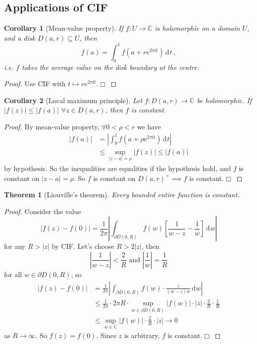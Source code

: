 \documentclass{article}
\theoremstyle{plain}\theoremheaderfont{\normalfont\itshape}\theorembodyfont{\rmfamily}\theoremseparator{.}\newtheorem*{rem}{Remark}\newtheorem*{ex}{Example}\newtheorem*{proof}{Proof}\newtheorem*{altp}{Alternative proof}\newtheorem*{con}{Consequences}\newtheorem*{notn}{Notations}\newtheorem*{cau}{Caution}\newtheorem*{term}{Terminology}\newtheorem*{keyex}{Key example}
\theoremstyle{plain}\theoremheaderfont{\normalfont\bfseries}\theorembodyfont{\rmfamily}\theoremseparator{.}\newtheorem{thm}{Theorem}[section]\newtheorem{lem}[thm]{Lemma}\newtheorem{prop}[thm]{Proposition}\newtheorem*{cor}{Corollary}\newtheorem{defn}[thm]{Definition}\newtheorem{clm}[thm]{Claim}\newtheorem{clminproof}{Claim}\newtheorem{leminproof}{Lemma}\newtheorem{app}{Application}
\theoremstyle{break}\theoremheaderfont{\normalfont\itshape}\theorembodyfont{\rmfamily}\theoremseparator{.\medskip}\newtheorem*{proofskip}{Proof}\newtheorem*{exs}{Examples}\newtheorem*{rems}{Remarks}\newtheorem*{rec}{Recall}\newtheorem*{ppts}{Properties}
\theoremstyle{break}\theoremheaderfont{\normalfont\bfseries}\theorembodyfont{\rmfamily}\theoremseparator{.\medskip}\newtheorem{lemskip}[thm]{Lemma}\newtheorem{defnskip}[thm]{Definition}\newtheorem{propskip}[thm]{Proposition}\newtheorem{thmskip}[thm]{Theorem}
\numberwithin{equation}{section}
\newcommand{\ii}{\mathrm{i}}
\newcommand{\ee}{\mathrm{e}}
\newcommand{\qed}{\hfill\ensuremath{\Box}}
\newcommand{\abs}[1]{\left|#1\right|}
\newcommand{\dd}[2][]{\,\mathrm{d}^{#1} #2}
\newcommand{\CC}{\mathbb{C}}
\begin{document}
    \subsection{Applications of CIF}
    \begin{cor}[Mean-value property]
        If \(f:U\to\CC\) is holomorphic on a domain \(U\), and a disk \(D(a,r)\subseteq U\), then
        \[f(a)=\int_{0}^{1}f(a+re^{2\pi \ii t})\dd{t}\,,\]
        i.e. \(f\) takes the average value on the disk boundary at the centre.
    \end{cor}
    \begin{proof}
        Use CIF with \(t\mapsto re^{2\pi \ii t}\).\qed
    \end{proof}
    \begin{cor}[Local maximum principle]
        Let \(f:D(a,r)\to\CC\) be holomorphic. If \(\abs{f(z)}\le\abs{f(a)}\) \(\forall z\in D(a,r)\), then \(f\) is constant.        
    \end{cor}
    \begin{proof}
        By mean-value property, \(\forall 0<\rho<r\) we have
        \begin{align*}
            \abs{f(a)}&=\abs{\int_{0}^{1}f(a+\rho \ee^{2\pi \ii t})\dd{t}}\\
            &\le\sup_{\abs{z-a}=\rho}\abs{f(z)}\le \abs{f(a)}
        \end{align*}
        by hypothesis. So the inequalities are equalities if the hypothesis hold, and \(f\) is constant on \(\abs{z-a}=\rho\). So \(f\) is constant on \(D(a,r)^\times\implies f\) is constant.\qed
    \end{proof}
    \begin{thm}[Liouville's theorem]
        Every bounded entire function is constant.
    \end{thm}
    \begin{proof}
        Consider the value
        \[\abs{f(z)-f(0)}=\frac{1}{2\pi}\abs{\int_{\partial D(0,R)}f(w)\left[\frac{1}{w-z}-\frac{1}{w}\right]\dd{w}}\]
        for any \(R>\abs{z}\) by CIF. Let's choose \(R>2\abs{z}\), then
        \[\abs{\frac{1}{w-z}}<\frac{2}{R}\text{ and }\abs{\frac{1}{w}}=\frac{1}{R}\]
        for all \(w\in\partial D(0,R)\), so
        \begin{align*}
            \abs{f(z)-f(0)}&=\frac{1}{2\pi}\abs{\int_{\partial D(0,R)}f(w)\cdot\frac{z}{(w-z)w}\dd{w}}\\
            &\le\frac{1}{2\pi}\cdot2\pi R\cdot\sup_{w\in\partial D(0,R)}\abs{f(w)}\cdot\abs{z}\cdot\frac{2}{R}\cdot\frac{1}{R}\\
            &\le\sup_{w\in\CC}\abs{f(w)}\cdot\frac{2}{R}\cdot\abs{z}\to 0
        \end{align*}
        as \(R\to\infty\). So \(f(z)=f(0)\). Since \(z\) is arbitrary, \(f\) is constant.\qed
    \end{proof}
\end{document}
